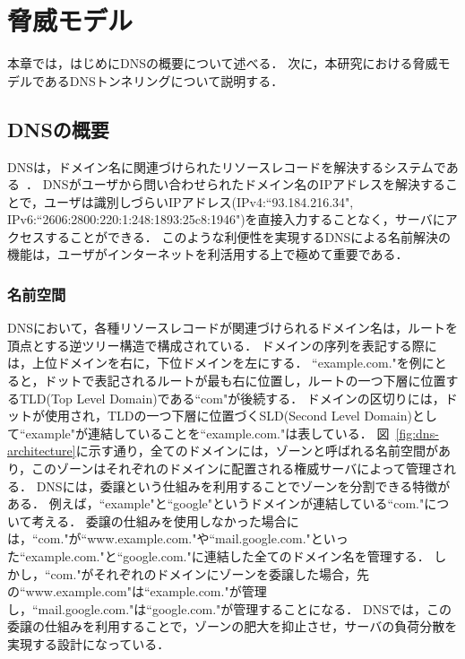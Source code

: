 \section{脅威モデル}
\label{sec:dns-tunneling}
本章では，はじめにDNSの概要について述べる．
次に，本研究における脅威モデルであるDNSトンネリングについて説明する．

\subsection{DNSの概要}
\label{sec:dns-protocol}

DNSは，ドメイン名に関連づけられたリソースレコードを解決するシステムである~\cite{rfc1034, rfc1035}．
DNSがユーザから問い合わせられたドメイン名のIPアドレスを解決することで，ユーザは識別しづらいIPアドレス(IPv4:``93.184.216.34", IPv6:``2606:2800:220:1:248:1893:25c8:1946")を直接入力することなく，サーバにアクセスすることができる．
このような利便性を実現するDNSによる名前解決の機能は，ユーザがインターネットを利活用する上で極めて重要である．

\subsubsection{名前空間}
DNSにおいて，各種リソースレコードが関連づけられるドメイン名は，ルートを頂点とする逆ツリー構造で構成されている．
ドメインの序列を表記する際には，上位ドメインを右に，下位ドメインを左にする．
``example.com."を例にとると，ドットで表記されるルートが最も右に位置し，ルートの一つ下層に位置するTLD(Top Level Domain)である``com"が後続する．
ドメインの区切りには，ドットが使用され，TLDの一つ下層に位置づくSLD(Second Level Domain)として``example"が連結していることを``example.com."は表している．
図~\ref{fig:dns-architecture}に示す通り，全てのドメインには，ゾーンと呼ばれる名前空間があり，このゾーンはそれぞれのドメインに配置される権威サーバによって管理される．
DNSには，委譲という仕組みを利用することでゾーンを分割できる特徴がある．
例えば，``example"と``google"というドメインが連結している``com."について考える．
委譲の仕組みを使用しなかった場合には，``com."が``www.example.com."や``mail.google.com."といった``example.com."と``google.com."に連結した全てのドメイン名を管理する．
しかし，``com."がそれぞれのドメインにゾーンを委譲した場合，先の``www.example.com"は``example.com."が管理し，``mail.google.com."は``google.com."が管理することになる．
DNSでは，この委譲の仕組みを利用することで，ゾーンの肥大を抑止させ，サーバの負荷分散を実現する設計になっている．

